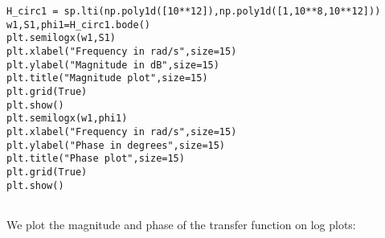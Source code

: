 \documentclass[11pt]{article}
\begin{document}
		
	
		
			
		
	
		
			
		
	
		
			
		
	
		
			
		
	
		
			
		
	
		
			
		
	
		
			
		
	
		
			
		
	
		
			
		
	
		
			
		
	
		
			
		
	
		
			
		
	
	\begin{Verbatim}
H_circ1 = sp.lti(np.poly1d([10**12]),np.poly1d([1,10**8,10**12]))
w1,S1,phi1=H_circ1.bode()
plt.semilogx(w1,S1)
plt.xlabel("Frequency in rad/s",size=15)
plt.ylabel("Magnitude in dB",size=15)
plt.title("Magnitude plot",size=15)
plt.grid(True)
plt.show()
plt.semilogx(w1,phi1)
plt.xlabel("Frequency in rad/s",size=15)
plt.ylabel("Phase in degrees",size=15)
plt.title("Phase plot",size=15)
plt.grid(True)
plt.show()


\end{Verbatim}

	

	

	
		
    We plot the magnitude and phase of the transfer function on log plots:

	

	

    \begin{center}
    \end{center}
    { \hspace*{\fill} \\}
    
    \begin{center}
    \end{center}
    { \hspace*{\fill} \\}
    
\end{document}
